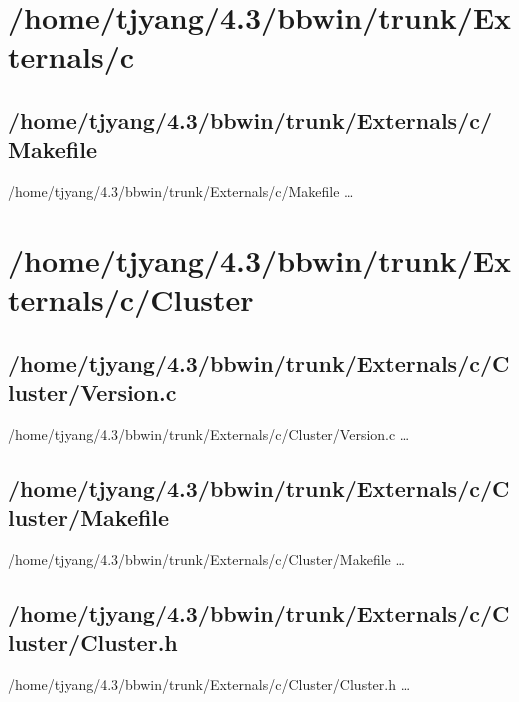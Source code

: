 \section{/home/tjyang/4.3/bbwin/trunk/Externals/c}

\subsection{/home/tjyang/4.3/bbwin/trunk/Externals/c/Makefile}
\lstset{numberstyle=\tiny,numbers=left,
   breaklines=true,
   stepnumber=1,numbersep=5pt,firstnumber=1,
   xleftmargin=12pt,showstringspaces=false}
\noindent /home/tjyang/4.3/bbwin/trunk/Externals/c/Makefile  \ldots



\section{/home/tjyang/4.3/bbwin/trunk/Externals/c/Cluster}


\subsection{/home/tjyang/4.3/bbwin/trunk/Externals/c/Cluster/Version.c}
\lstset{numberstyle=\tiny,numbers=left,
   breaklines=true,
   stepnumber=1,numbersep=5pt,firstnumber=1,
   xleftmargin=12pt,showstringspaces=false}
\noindent /home/tjyang/4.3/bbwin/trunk/Externals/c/Cluster/Version.c  \ldots



\subsection{/home/tjyang/4.3/bbwin/trunk/Externals/c/Cluster/Makefile}
\lstset{numberstyle=\tiny,numbers=left,
   breaklines=true,
   stepnumber=1,numbersep=5pt,firstnumber=1,
   xleftmargin=12pt,showstringspaces=false}
\noindent /home/tjyang/4.3/bbwin/trunk/Externals/c/Cluster/Makefile  \ldots




\subsection{/home/tjyang/4.3/bbwin/trunk/Externals/c/Cluster/Cluster.h}
\lstset{numberstyle=\tiny,numbers=left,
   breaklines=true,
   stepnumber=1,numbersep=5pt,firstnumber=1,
   xleftmargin=12pt,showstringspaces=false}
\noindent /home/tjyang/4.3/bbwin/trunk/Externals/c/Cluster/Cluster.h  \ldots



